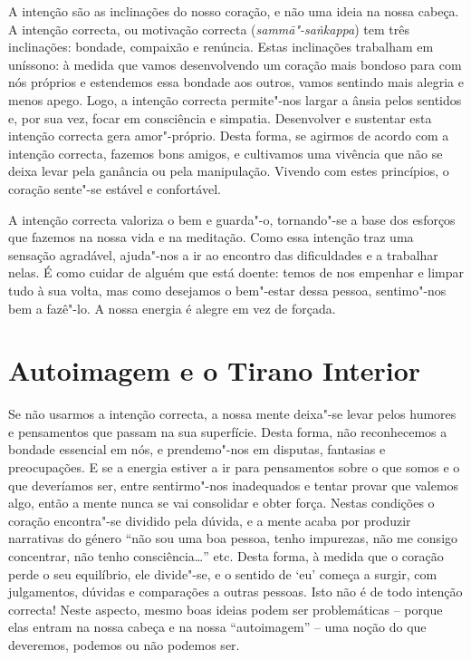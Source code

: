 A intenção são as inclinações do nosso coração, e não uma ideia na nossa
cabeça. A intenção correcta, ou motivação correcta
(\emph{sammā"-saṅkappa}) tem três inclinações: bondade, compaixão e
renúncia. Estas inclinações trabalham em uníssono: à medida que vamos
desenvolvendo um coração mais bondoso para com nós próprios e estendemos
essa bondade aos outros, vamos sentindo mais alegria e menos apego.
Logo, a intenção correcta permite"-nos largar a ânsia pelos sentidos e,
por sua vez, focar em consciência e simpatia. Desenvolver e sustentar
esta intenção correcta gera amor"-próprio. Desta forma, se agirmos de
acordo com a intenção correcta, fazemos bons amigos, e cultivamos uma
vivência que não se deixa levar pela ganância ou pela manipulação.
Vivendo com estes princípios, o coração sente"-se estável e confortável.

A intenção correcta valoriza o bem e guarda"-o, tornando"-se a base dos
esforços que fazemos na nossa vida e na meditação. Como essa intenção
traz uma sensação agradável, ajuda"-nos a ir ao encontro das dificuldades
e a trabalhar nelas. É como cuidar de alguém que está doente: temos de
nos empenhar e limpar tudo à sua volta, mas como desejamos o bem"-estar
dessa pessoa, sentimo"-nos bem a fazê"-lo. A nossa energia é alegre em vez
de forçada.

\section{Autoimagem e o Tirano Interior}

Se não usarmos a intenção correcta, a nossa mente deixa"-se levar pelos
humores e pensamentos que passam na sua superfície. Desta forma, não
reconhecemos a bondade essencial em nós, e prendemo"-nos em disputas,
fantasias e preocupações. E se a energia estiver a ir para pensamentos
sobre o que somos e o que deveríamos ser, entre sentirmo"-nos inadequados
e tentar provar que valemos algo, então a mente nunca se vai consolidar
e obter força. Nestas condições o coração encontra"-se dividido pela
dúvida, e a mente acaba por produzir narrativas do género “não sou uma
boa pessoa, tenho impurezas, não me consigo concentrar, não tenho
consciência\ldots{}” etc. Desta forma, à medida que o coração perde o seu
equilíbrio, ele divide"-se, e o sentido de `eu' começa a surgir, com
julgamentos, dúvidas e comparações a outras pessoas. Isto não é de todo
intenção correcta! Neste aspecto, mesmo boas ideias podem ser
problemáticas -- porque elas entram na nossa cabeça e na nossa
“autoimagem” -- uma noção do que deveremos, podemos ou não podemos ser.


